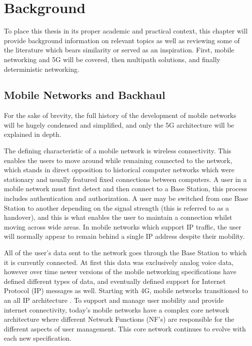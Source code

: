 
\cleardoublepage
\chapter{Background}
\label{cha:background}

To place this thesis in its proper academic and practical context, this chapter will provide background information on relevant topics as well as reviewing some of the literature which bears similarity or served as an inspiration. First, mobile networking and 5G will be covered, then multipath solutions, and finally deterministic networking.

\section{Mobile Networks and Backhaul}

For the sake of brevity, the full history of the development of mobile networks will be hugely condensed and simplified, and only the 5G architecture will be explained in depth.

The defining characteristic of a mobile network is wireless connectivity. This enables the users to move around while remaining connected to the network, which stands in direct opposition to historical computer networks which were stationary and usually featured fixed connections between computers. A user in a mobile network must first detect and then connect to a Base Station, this process includes authentication and authorization. A user may be switched from one Base Station to another depending on the signal strength (this is referred to as a handover), and this is what enables the user to maintain a connection whilst moving across wide areas. In mobile networks which support IP traffic, the user will normally appear to remain behind a single IP address despite their mobility.

All of the user's data sent to the network goes through the Base Station to which it is currently connected. At first this data was exclusively analog voice data, however over time newer versions of the mobile networking specifications have defined different types of data, and eventually defined support for Internet Protocol (IP) messages as well. Starting with 4G, mobile networks transitioned to an all IP architecture \cite{3gpp.36.300}. To support and manage user mobility and provide internet connectivity, today's mobile networks have a complex core network architecture where different Network Functions (NF's) are responsible for the different aspects of user management. This core network continues to evolve with each new specification.

